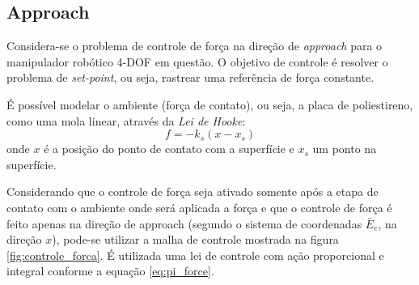 \subsection{Approach} \label{sec:forca_approach}
Considera-se o problema de controle de força na direção de \textit{approach} para o manipulador robótico 4-DOF em questão. O objetivo de controle é resolver o problema de \textit{set-point}, ou seja, rastrear uma referência de força constante.

É possível modelar o ambiente (força de contato), ou seja, a placa de poliestireno, como uma mola linear, através da \textit{Lei de Hooke}: 
\begin{equation}
f = -k_s (x - x_s)
\end{equation}
onde $x$ é a posição do ponto de contato com a superfície e $x_s$ um ponto na superfície.

Considerando que o controle de força seja ativado somente após a etapa de contato com o ambiente onde será aplicada a força e que o controle de força é feito apenas na direção de approach (segundo o sistema de coordenadas $\bar{E}_e$, na direção $x$), pode-se utilizar a malha de controle mostrada na figura \ref{fig:controle_forca}. É utilizada uma lei de controle com ação proporcional e integral conforme a equação \eqref{eq:pi_force}.



